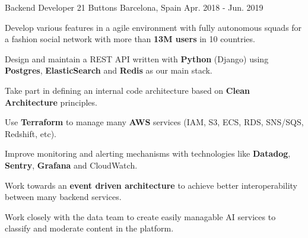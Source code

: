 \begin{cventries}
  \cventry
    {Backend Developer} %
    {21 Buttons} %
    {Barcelona, Spain} %
    {Apr. 2018 - Jun. 2019} %
    {
      \begin{cvitems} %
        \item {Develop various features in a agile environment with fully autonomous squads for a fashion social network with more than \textbf{13M users} in 10 countries.}
        \item {Design and maintain a REST API written with \textbf{Python} (Django) using \textbf{Postgres}, \textbf{ElasticSearch} and \textbf{Redis} as our main stack.}
        \item {Take part in defining an internal code architecture based on \textbf{Clean Architecture} principles.}
        \item {Use \textbf{Terraform} to manage many \textbf{AWS} services (IAM, S3, ECS, RDS, SNS/SQS, Redshift, etc).}
        \item {Improve monitoring and alerting mechanisms with technologies like \textbf{Datadog}, \textbf{Sentry}, \textbf{Grafana} and CloudWatch.}
        \item {Work towards an \textbf{event driven architecture} to achieve better interoperability between many backend services.}
        \item {Work closely with the data team to create easily managable AI services to classify and moderate content in the platform.}
      \end{cvitems}
    }


\end{cventries}
